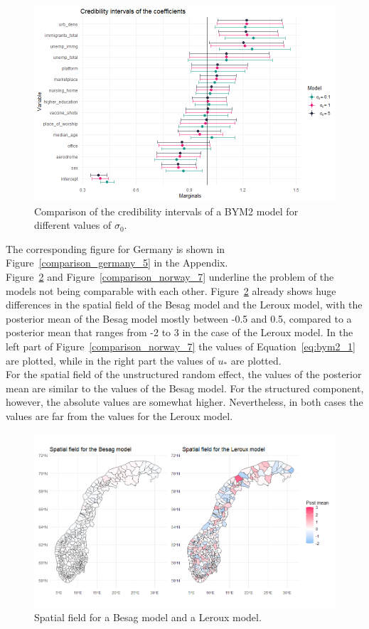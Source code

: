 \begin{figure}[H]
  \centering
  \includegraphics[width = \textwidth]{intervals_prior_norway.png}
  \caption{Comparison of the credibility intervals of a BYM2 model for different values of $\sigma_0$.}
  \label{comparison_norway_5}
\end{figure}
The corresponding figure for Germany is shown in Figure~\ref{comparison_germany_5} in the Appendix. \\
Figure~\ref{comparison_norway_6} and Figure~\ref{comparison_norway_7} underline the problem of the models not being comparable with each other. Figure~\ref{comparison_norway_6} already shows huge differences in the spatial field of the Besag model and the Leroux model, with the posterior mean of the Besag model mostly between -0.5 and 0.5, compared to a posterior mean that ranges from -2 to 3 in the case of the Leroux model. In the left part of Figure~\ref{comparison_norway_7} the values of Equation~\ref{eq:bym2_1} are plotted, while in the right part the values of $u_{*}$ are plotted. \\
For the spatial field of the unstructured random effect, the values of the posterior mean are similar to the values of the Besag model. For the structured component, however, the absolute values are somewhat higher. Nevertheless, in both cases the values are far from the values for the Leroux model.
\begin{figure}[H]
  \centering
  \includegraphics[width = \textwidth]{spatial_field_norway_1.png}
  \caption{Spatial field for a Besag model and a Leroux model.}
  \label{comparison_norway_6}
\end{figure}
